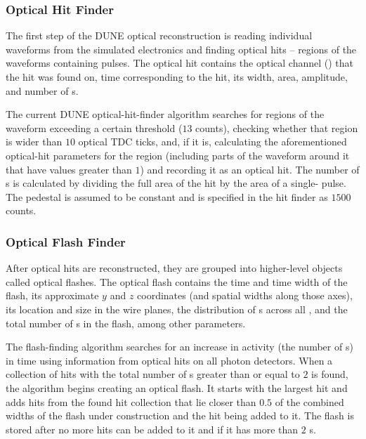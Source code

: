 \subsubsection{Optical Hit Finder}
\label{sec:OpticalHitFinder}
The first step of the DUNE optical reconstruction is reading
individual waveforms from the simulated  electronics
and finding optical hits -- regions of the waveforms containing pulses.
The optical hit contains the optical channel () that the hit
was found on, time corresponding to the hit, its width,
area, amplitude, and number of \phel{}s.

The current DUNE optical-hit-finder algorithm searches for regions of the waveform
exceeding a certain threshold ($13$  counts), checking whether that region
is wider than $10$ optical TDC ticks,  and, if it is, calculating the aforementioned
optical-hit parameters for the region (including parts of the waveform around it
that have  values greater than $1$) and recording it as an optical hit.
The number of \phel{}s is calculated by dividing the full area of the hit
by the area of a single-\phel{} pulse.
The pedestal is assumed to be constant and is specified in the hit finder as $1500$  counts.


\subsubsection{Optical Flash Finder}
After optical hits are reconstructed, they are grouped into higher-level objects called optical flashes.
The optical flash contains the time and time width of the flash,
its approximate $y$ and $z$ coordinates (and spatial widths along those axes),
its location and size in the wire planes,
the distribution of \phel{}s across all ,
and the total number of \phel{}s in the flash, among other parameters.

The flash-finding algorithm searches for an increase in  activity
(the number of \phel{}s) in time using information from optical hits
on all photon detectors.
When a collection of hits with the total number of \phel{}s  
greater than or equal to $2$ is found, the algorithm begins creating an optical flash.
It starts with the largest hit and adds hits from the found hit collection 
that lie closer than $0.5$  of the combined widths of the flash under construction
and the hit being added to it.
The flash is stored after no more hits can be added to it
and if it has more than $2$ \phel{}s.

